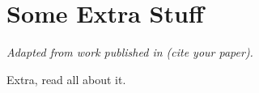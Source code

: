 \chapter{Some Extra Stuff}
\label{chapter:appendixa}

\begin{center}
    \textit{Adapted from work published in (cite your paper).}
\end{center}

Extra, read all about it.